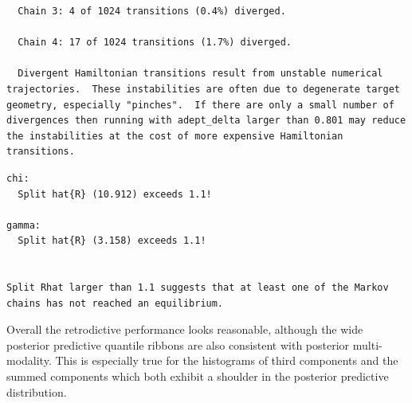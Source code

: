 \documentclass[
  letterpaper,
  DIV=11,
  numbers=noendperiod]{scrartcl}
\newenvironment{Shaded}{\begin{snugshade}}{\end{snugshade}}
\newcommand{\FunctionTok}[1]{\textcolor[rgb]{0.28,0.35,0.67}{#1}}
\newcommand{\NormalTok}[1]{\textcolor[rgb]{0.00,0.23,0.31}{#1}}
\newcommand{\OtherTok}[1]{\textcolor[rgb]{0.00,0.23,0.31}{#1}}
\newcommand{\SpecialCharTok}[1]{\textcolor[rgb]{0.37,0.37,0.37}{#1}}
\newcommand{\StringTok}[1]{\textcolor[rgb]{0.13,0.47,0.30}{#1}}
\begin{document}
\begin{verbatim}
  Chain 3: 4 of 1024 transitions (0.4%) diverged.

  Chain 4: 17 of 1024 transitions (1.7%) diverged.

  Divergent Hamiltonian transitions result from unstable numerical
trajectories.  These instabilities are often due to degenerate target
geometry, especially "pinches".  If there are only a small number of
divergences then running with adept_delta larger than 0.801 may reduce
the instabilities at the cost of more expensive Hamiltonian
transitions.
\end{verbatim}

\begin{Shaded}
\end{Shaded}

\begin{verbatim}
chi:
  Split hat{R} (10.912) exceeds 1.1!

gamma:
  Split hat{R} (3.158) exceeds 1.1!


Split Rhat larger than 1.1 suggests that at least one of the Markov
chains has not reached an equilibrium.
\end{verbatim}

Overall the retrodictive performance looks reasonable, although the wide
posterior predictive quantile ribbons are also consistent with posterior
multi-modality. This is especially true for the histograms of third
components and the summed components which both exhibit a shoulder in
the posterior predictive distribution.
\end{document}
